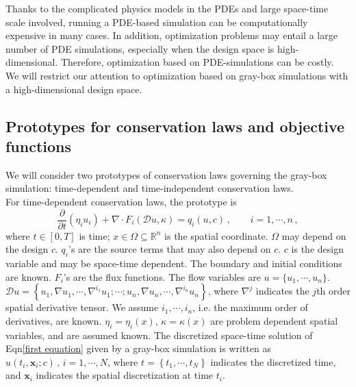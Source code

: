 \documentclass[a4paper,onecolumn]{article}
\theoremstyle{remark}
\begin{document}
\noindent Thanks to the complicated physics models in the PDEs and large space-time scale involved, 
running a PDE-based simulation can be computationally expensive in many cases. 
In addition, optimization problems may entail a large number of 
PDE simulations, especially when the design space is high-dimensional.
Therefore, optimization based on PDE-simulations can be costly.\\

\noindent We will restrict our attention to optimization based on gray-box simulations with a high-dimensional design space.

\subsection{Prototypes for conservation laws and objective functions}
\label{psetup}
\noindent We will consider two prototypes of conservation laws governing the gray-box simulation: 
time-dependent and time-independent conservation laws.\\

\noindent For time-dependent conservation laws, the prototype is
\begin{equation}
    \frac{\partial}{\partial t}\left(\eta_i u_i\right) + \nabla \cdot 
    F_i(\mathcal{D} u, \kappa) 
    = q_i(u,c)\,, \qquad i=1,\cdots, n\,,
    \label{first equation}
\end{equation}
where $t\in[0,T]$ is time;
$x\in \Omega \subseteq \mathbb{R}^{n}$ is the spatial coordinate.
$\Omega$ may depend on the design $c$.
$q_i$'s are the source terms that may also depend on $c$.
$c$ is the design variable and may be space-time dependent.
The boundary and initial conditions are known. $F_i$'s are the flux functions. 
The flow variables are 
$u = \{u_1, \cdots, u_n\}$.
$\mathcal{D} u = \left\{u_1, \nabla u_1 , \cdots, \nabla^{i_1} u_1; \cdots;
u_n, \nabla u_n,\cdots, \nabla^{i_n} u_n\right\}$, where $\nabla^j$ indicates the $j$th
order spatial derivative tensor. We assume $i_1,\cdots, i_n$, i.e. the maximum 
order of derivatives, are known.
$\eta_i=\eta_i(x), \,\kappa=\kappa(x)$ are 
problem dependent spatial variables, and are assumed known. 
The discretized space-time solution of Eqn\eqref{first equation} given by a gray-box simulation
is written as $\hat{u}(t_i, \mathbf{x}_i; c)\,,\, i=1,\cdots,N$, where 
$t=\left\{t_1,\cdots, t_N\right\}$ indicates the discretized time, and 
$\mathbf{x}_i$ indicates the spatial discretization at time $t_i$.\\
\end{document}
